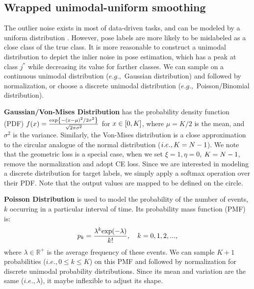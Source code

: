 \subsection{Wrapped unimodal-uniform smoothing}



The outlier noise exists in most of data-driven tasks, and can be modeled by a uniform distribution \cite{szegedy2016rethinking}. However, pose labels are more likely to be mislabeled as a close class of the true class. It is more reasonable to construct a unimodal distribution to depict the inlier noise in pose estimation, which has a peak at class $j^*$ while decreasing its value for farther classes. We can sample on a continuous unimodal distribution ($e.g.,$ Gaussian distribution) and followed by normalization, or choose a discrete unimodal distribution ($e.g.,$ Poisson/Binomial distribution). 


\noindent\textbf{Gaussian/Von-Mises Distribution} has the probability density function (PDF) $f(x)=\frac{{\rm{exp}}\left\{-(x-\mu)^2/2\sigma^2\right\}}{\sqrt{2\pi\sigma^2}}$ for $x\in [0,\small K]$, where $\mu=K/2$ is the mean, and $\sigma^{2}$ is the variance. Similarly, the Von-Mises distribution is a close approximation to the circular analogue of the normal distribution ($i.e., \small K=N-1$). We note that the geometric loss \cite{su2015render} is a special case, when we set $\xi=1,\eta=0$, $\small{K=N-1}$, remove the normalization and adopt CE loss. Since we are interested in modeling a discrete distribution for target labels, we simply apply a softmax operation over their PDF. Note that the output values are mapped to be defined on the circle.

 

\noindent\textbf{Poisson Distribution} is used to model the probability of the number of events, $k$ occurring in a particular interval of time. Its probability mass function (PMF) is:\vspace{-5pt}\begin{equation}
p_k=\frac{\lambda^k{\rm{exp}}(-\lambda)}{k!},~~~k= 0, 1, 2, ...,       
\end{equation}\vspace{-2pt}where $\lambda\in \mathbb{R}^+$ is the average frequency of these events. We can sample $K+1$ probabilities ($i.e., 0\leq k\leq K$) on this PMF and followed by normalization for discrete unimodal probability distributions. Since its mean and variation are the same ($i.e., \lambda$), it maybe inflexible to adjust its shape.     


